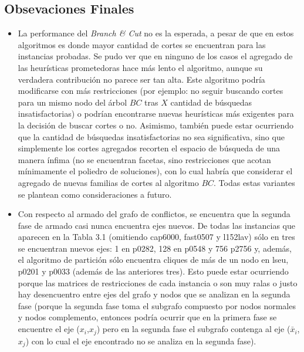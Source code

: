 \subsection{Obsevaciones Finales}

\begin{itemize}

\item La performance del \emph{Branch \& Cut} no es la esperada, a pesar de que en estos algoritmos es donde mayor cantidad de cortes se encuentran para las instancias probadas. Se pudo ver que en ninguno de los casos el agregado de las heurísticas prometedoras hace más lento el algoritmo, aunque su verdadera contribución no parece ser tan alta. Este algoritmo podría modificarse con más restricciones (por ejemplo: no seguir buscando cortes para un mismo nodo del árbol $BC$ tras $X$ cantidad de búsquedas insatisfactorias) o podrían encontrarse nuevas heurísticas más exigentes para la decisión de buscar cortes o no. Asimismo, también puede estar ocurriendo que la cantidad de búsquedas insatisfactorias no sea significativa, sino que simplemente los cortes agregados recorten el espacio de búsqueda de una manera ínfima (no se encuentran facetas, sino restricciones que acotan mínimamente el poliedro de soluciones), con lo cual habría que considerar el agregado de nuevas familias de cortes al algoritmo $BC$. Todas estas variantes se plantean como consideraciones a futuro.


\item Con respecto al armado del grafo de conflictos, se encuentra que la segunda fase de armado casi nunca encuentra ejes nuevos. De todas las instancias que aparecen en la Tabla 3.1 (omitiendo cap6000, fast0507 y l152lav) sólo en tres se encuentran nuevos ejes: 1 en p0282, 128 en p0548 y 756 p2756 y, además, el algoritmo de partición sólo encuentra cliques de más de un nodo en lseu, p0201 y p0033 (además de las anteriores tres). Esto puede estar ocurriendo porque las matrices de restricciones de cada instancia o son muy ralas o justo hay desencuentro entre ejes del grafo y nodos que se analizan en la segunda fase (porque la segunda fase toma el subgrafo compuesto por nodos normales y nodos complemento, entonces podría ocurrir que en la primera fase se encuentre el eje ($x_i$,$x_j$) pero en la segunda fase el subgrafo contenga al eje ($\bar{x}_i$,$x_j$) con lo cual el eje encontrado no se analiza en la segunda fase). 



\end{itemize}
